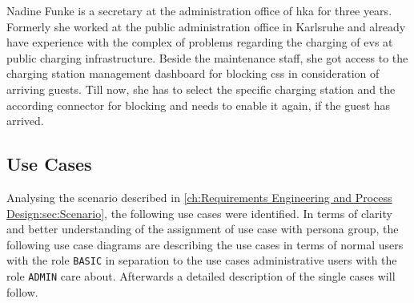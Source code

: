 Nadine Funke is a secretary at the administration office of \acrshort{hka} for three years. Formerly she worked at the public administration office in Karlsruhe and already have experience with the complex of problems regarding the charging of \acrshort{ev}s at public charging infrastructure. Beside the maintenance staff, she got access to the charging station management dashboard for blocking \acrshort{cs}s in consideration of arriving guests. Till now, she has to select the specific charging station and the according connector for blocking and needs to enable it again, if the guest has arrived. 

\subsection{Use Cases}
\label{ch:Requirements Engineering and Process Design:sec:Scenario:ssec:Use Cases}

Analysing the scenario described in \ref{ch:Requirements Engineering and Process Design:sec:Scenario}, the following use cases were identified. In terms of clarity and better understanding of the assignment of use case with persona group, the following use case diagrams are describing the use cases in terms of normal users with the role \verb|BASIC| in separation to the use cases administrative users with the role \verb|ADMIN| care about. Afterwards a detailed description of the single cases will follow.

